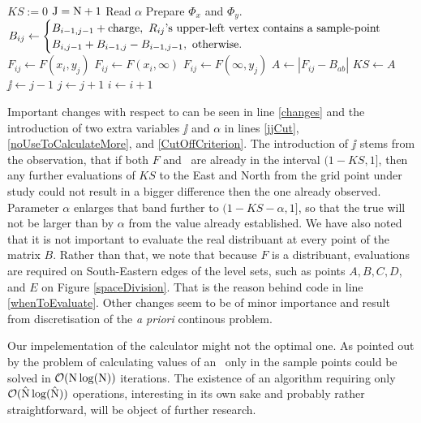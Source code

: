 \begin{Algo}[2D-ECDF]
	\
	\begin{algorithmic}[1]
		\State $KS := 0$ 
		\State $\mathrm{J} = \mathrm{N}+1$
	 	\State Read $\alpha$
		\State Prepare $\Phi_x$ and $\Phi_y$. 	
			\label{jjCut}
				\State \,$B_{ij} \gets 
				\begin{cases} 
					B_{i-1,j-1} + \text{charge}, \text{ $R_{ij}$'s upper-left vertex contains a sample-point} \cr
					B_{i,j-1} + B_{i-1,j} -  B_{i-1,j-1}, \text{ otherwise.} 
				\end{cases}$
					\State $F_{ij} \gets F(x_i, y_j)$\label{whenToEvaluate}
					\State $F_{ij} \gets F(x_i,\infty)$
					\State $F_{ij} \gets F(\infty, y_j)$
				\EndIf
					\State $A \gets |F_{ij} - B_{ab}|$\label{changes}
						\State $KS \gets A$
					\EndIf
					\label{CutOffCriterion}
						\State $\jj \gets j-1$\label{noUseToCalculateMore}
					\EndIf
				\EndFor
				\State $j \gets j+1$
			\EndWhile
			\State $i \gets i+1$
		\EndWhile
	\end{algorithmic}
\end{Algo}



Important changes with respect to \citet{NiVingron} can be seen in line \ref{changes} and the introduction of two extra variables $\jj$ and $\alpha$ in lines \ref{jjCut}, \ref{noUseToCalculateMore}, and \ref{CutOffCriterion}. The introduction of $\jj$ stems from the observation, that if both $F$ and \Fecdf\, are already in the interval $(1-KS,1]$, then any further evaluations of $KS$ to the East and North from the grid point under study could not result in a bigger difference then the one already observed. Parameter $\alpha$ enlarges that band further to $(1-KS-\alpha,1]$, so that the true \KS will not be larger than by $\alpha$ from the value already established. We have also noted that it is not important to evaluate the real distribuant at every point of the matrix $B$. Rather than that, we note that because $F$ is a distribuant, evaluations are required on South-Eastern edges of the level sets, such as points $A, B, C, D$, and $E$ on Figure \ref{spaceDivision}. That is the reason behind code in line \ref{whenToEvaluate}. Other changes seem to be of minor importance and result from discretisation of the {\it a priori} continous problem. 


Our impelementation of the \KS calculator might not the optimal one. As pointed out by \citet*{Jon} the problem of calculating values of an \ecdf\, only in the sample points could be solved in $\mathcal{O}(\mathrm{N} \log( \mathrm{N} ))$ iterations. The existence of an algorithm requiring only $\mathcal{O}(\hat{\mathrm{N}} \log( \hat{\mathrm{N}}  ))$ operations, interesting in its own sake and probably rather straightforward, will be object of further research.
